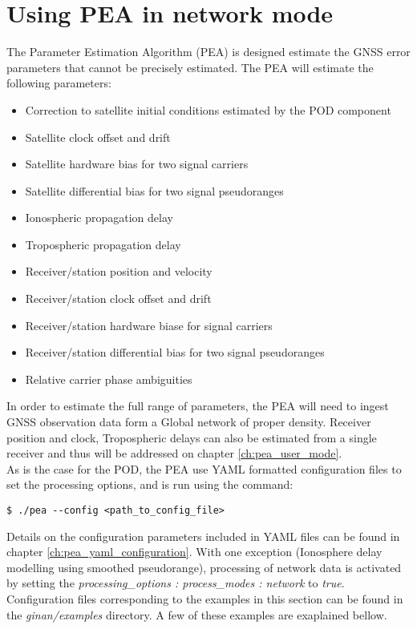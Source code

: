 \chapter{Using PEA in network mode}
\label{ch:pea_network_mode}
The Parameter Estimation Algorithm (PEA) is designed estimate the GNSS error parameters that cannot be precisely estimated. The PEA will estimate the following parameters:
\begin{itemize}
	\item Correction to satellite initial conditions estimated by the POD component
	\item Satellite clock offset and drift
	\item Satellite hardware bias for two signal carriers
	\item Satellite differential bias for two signal pseudoranges 
	\item Ionospheric propagation delay
	\item Tropospheric propagation delay
	\item Receiver/station position and velocity
	\item Receiver/station clock offset and drift
	\item Receiver/station hardware biase for signal carriers
	\item Receiver/station differential bias for two signal pseudoranges 
	\item Relative carrier phase ambiguities
\end{itemize}  
In order to estimate the full range of parameters, the PEA will need to ingest GNSS observation data form a Global network of proper density. Receiver position and clock, Tropospheric delays can also be estimated from a single receiver and thus will be addressed on chapter \ref{ch:pea_user_mode}.\\

As is the case for the POD, the PEA use YAML formatted configuration files to set the processing options, and is run using the command:
\begin{verbatim}
$ ./pea --config <path_to_config_file>
\end{verbatim}
Details on the configuration parameters included in YAML files can be found in chapter \ref{ch:pea_yaml_configuration}.
With one exception (Ionosphere delay modelling using smoothed pseudorange), processing of network data is activated by setting the \textit{ processing\_options : process\_modes : network} to \textit{true}.
Configuration files corresponding to the examples in this section can be found in the \textit{ginan/examples} directory. A few of these examples are exaplained bellow.\\

